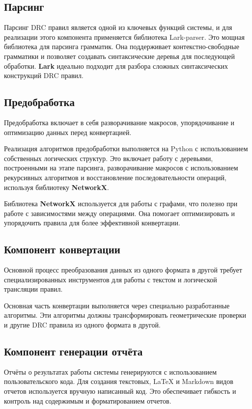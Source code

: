 \subsection{Парсинг}

Парсинг DRC правил является одной из ключевых функций системы,
и для реализации этого компонента применяется библиотека Lark-parser.
Это мощная библиотека для парсинга грамматик.
Она поддерживает контекстно-свободные грамматики
и позволяет создавать синтаксические деревья для последующей обработки.
\textbf{Lark} идеально подходит для разбора
сложных синтаксических конструкций DRC правил.

\subsection{Предобработка}

Предобработка включает в себя разворачивание макросов,
упорядочивание и оптимизацию данных перед конвертацией.\par
Реализация алгоритмов предобработки выполняется на Python
с использованием собственных логических структур.
Это включает работу с деревьями, построенными на этапе парсинга,
разворачивание макросов с использованием рекурсивных алгоритмов
и восстановление последовательности операций,
используя библиотеку \textbf{NetworkX}.\par
Библиотека \textbf{NetworkX} используется для работы с графами,
что полезно при работе с зависимостями между операциями.
Она помогает оптимизировать и упорядочить правила
для более эффективной конвертации.

\subsection{Компонент конвертации}

Основной процесс преобразования данных из одного формата в другой
требует специализированных инструментов
для работы с текстом и логической трансляции правил.\par
Основная часть конвертации выполняется
через специально разработанные алгоритмы.
Эти алгоритмы должны трансформировать геометрические проверки
и другие DRC правила из одного формата в другой.

\subsection{Компонент генерации отчёта}

Отчёты о результатах работы системы генерируются
с использованием пользовательского кода.
Для создания текстовых, LaTeX и Markdown видов отчетов используется
вручную написанный код.
Это обеспечивает гибкость и контроль над содержимым и форматированием отчетов.

